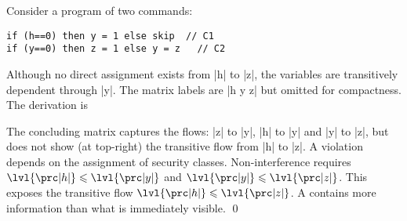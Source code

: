 \begin{example}
Consider a program of two commands:

\begin{lstlisting}
if (h==0) then y = 1 else skip  // C1
if (y==0) then z = 1 else y = z   // C2
\end{lstlisting}
Although no direct assignment exists from \prc|h| to \prc|z|, the variables are transitively dependent through \prc|y|.
The matrix labels are \prc|h y z| but omitted for compactness.
The derivation is
\begin{center}
\end{center}

The concluding matrix captures the flows: \prc|z| to \prc|y|, \prc|h| to \prc|y| and \prc|y| to \prc|z|,
but does not show (at top-right) the transitive flow from \prc|h| to \prc|z|.
A violation depends on the assignment of security classes.
Non-interference requires \(\lvl{\prc|h|} \leqslant \lvl{\prc|y|}\) and \(\lvl{\prc|y|} \leqslant \lvl{\prc|z|}\).
This exposes the transitive flow $\lvl{\prc|h|} \leqslant \lvl{\prc|z|}$.
A \SFM contains more information than what is immediately visible.
\qed\end{example}

